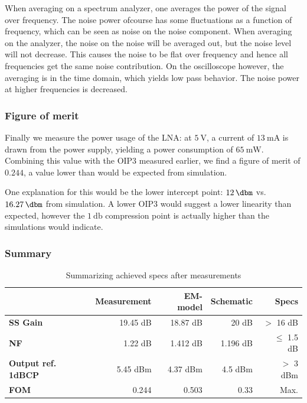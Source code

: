 \documentclass[a4paper]{article}        %
\begin{document}
  When averaging on a spectrum analyzer, one averages the power of the signal over frequency. The noise power ofcourse has some fluctuations as a function of frequency, which can be seen as noise on the noise component. When averaging on the analyzer, the noise on the noise will be averaged out, but the noise level will not decrease. This causes the noise to be flat over frequency and hence all frequencies get the same noise contribution. On the oscilloscope however, the averaging is in the time domain, which yields low pass behavior. The noise power at higher frequencies is decreased. 


  \subsubsection{Figure of merit}
  Finally we measure the power usage of the LNA: at $\SI{5}{\volt}$, a current of $\SI{13}{\milli\ampere}$ is drawn from the power supply, yielding a power consumption of $\SI{65}{\milli\watt}$.
  Combining this value with the OIP3 measured earlier, we find a figure of merit of $0.244$, a value lower than would be expected from simulation.

  One explanation for this would be the lower intercept point: $\SI{12}{\dbm}$ vs. $\SI{16.27}{\dbm}$ from simulation.
  A lower OIP3 would suggest a lower linearity than expected, however the $\SI{1}{\decibel}$ compression point is actually higher than the simulations would indicate.


   \subsubsection{Summary}

  \begin{table}[H]
		\centering
		\begin{tabular}{|l|r|r|r|r|}
			\hline
			 &  \textbf{Measurement} & \textbf{EM-model} &  \textbf{Schematic} & \textbf{Specs} \\
			\hline
			\textbf{SS Gain} & 19.45 dB & 18.87 dB &  20 dB & $>$ 16 dB \\
			\hline
			\textbf{NF} & 1.22 dB & 1.412 dB & 1.196 dB & $\leq$ 1.5 dB \\
			\hline
			\textbf{Output ref. 1dBCP} & 5.45 dBm & 4.37 dBm & 4.5 dBm & $>$ 3 dBm \\
			\hline
			\textbf{FOM} & 0.244 & 0.503 & 0.33 & Max. \\
			\hline
		\end{tabular}
		\caption{Summarizing achieved specs after measurements}
		\label{tab:lna_meas_summ}
  \end{table}
\end{document}
